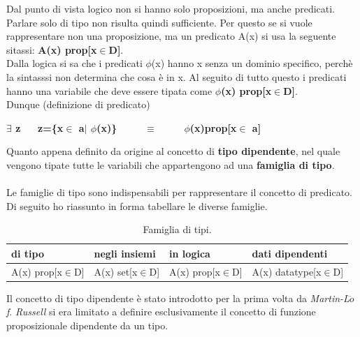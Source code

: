 \documentclass[10pt,a4paper, italian]{book}
\begin{document}
Dal punto di vista logico non si hanno solo proposizioni, ma anche predicati. Parlare solo di tipo non risulta quindi sufficiente. Per questo se si vuole rappresentare non una proposizione, ma un predicato A(x) si usa la seguente sitassi: \textbf{A(x) prop[x$\in$D]}.\\
Dalla logica si sa che i predicati $\phi$(x) hanno x senza un dominio specifico, perch\`e la sintasssi non determina che cosa \`e in x. Al seguito di tutto questo i predicati hanno una variabile che deve essere tipata come \textbf{$\phi$(x) prop[x$\in$D]}.\\
Dunque (definizione di predicato)
\begin{center}\textbf{$\exists$ z $\quad$ z=\{x$\in$ a$|$ $\phi$(x)\} $\qquad$ $\equiv$ $\qquad$ $\phi$(x)prop[x$\in$ a]}\end{center}
\noindent
Quanto appena definito da origine al concetto di \textbf{tipo dipendente}, nel quale vengono tipate tutte le variabili che appartengono ad una \textbf{famiglia di tipo}.\\\\
Le famiglie di tipo sono indispensabili per rappresentare il concetto di predicato. Di seguito ho riassunto in forma tabellare le diverse famiglie.\\

\begin{table}[h]
\centering
\begin{tabularx}{\textwidth}{XXXp{3.1cm}}
\hline 
\rowcolor{orange}
{\color[HTML]{FFFFFF}\textbf{di tipo}} & {\color[HTML]{FFFFFF}\textbf{negli insiemi}} & {\color[HTML]{FFFFFF} \textbf{in logica}} & {\color[HTML]{FFFFFF}\textbf{dati dipendenti}} \\
\hline\hline 
A(x) prop[x$\in$D] & A(x) set[x$\in$D] & A(x) prop[x$\in$D] & A(x) datatype[x$\in$D]  \\  
\hline 
\end{tabularx}
\caption{\label{tab:famiglia-di-tipi}Famiglia di tipi.} 
\end{table}
\noindent
Il concetto di tipo dipendente \`e stato introdotto per la prima volta da \textit{Martin-L$\ddot{o}$f}. \textit{Russell} si era limitato a definire esclusivamente il concetto di funzione proposizionale dipendente da un tipo.
\newpage
\end{document}
